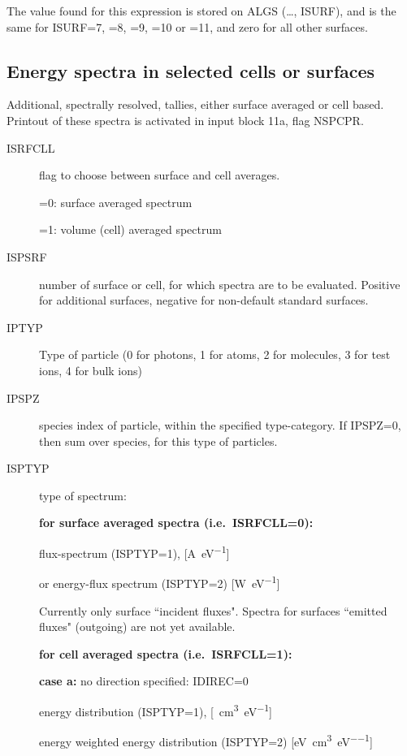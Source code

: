 The value found for this expression is stored on ALGS (\dots, ISURF), and is
the same for ISURF=7, =8, =9, =10 or =11, and zero for all other surfaces.

\subsection{Energy spectra in selected cells or surfaces}\label{sec2.10G}

Additional, spectrally resolved, tallies, either surface averaged or cell
based.
Printout of these spectra is activated in input block 11a, flag NSPCPR.

\begin{description}
  \item[ISRFCLL] flag to choose between surface and cell averages.

        =0:  surface averaged spectrum

        =1:  volume (cell) averaged spectrum
  \item[ISPSRF]
        number of surface or cell, for which spectra are to be evaluated.
        Positive for additional surfaces, negative for non-default standard surfaces.
  \item[IPTYP] Type of particle (0 for photons, 1 for atoms, 2 for molecules, 3
        for test ions, 4 for bulk ions)
  \item[IPSPZ] species index of particle, within
        the specified type-category.
        If IPSPZ=0, then sum over species, for this type of particles.

  \item[ISPTYP] type of spectrum:

        \textbf{for surface averaged spectra (i.e.\ ISRFCLL=0):}

        flux-spectrum (ISPTYP=1), [\si{\ampere\per\electronvolt}]

        or energy-flux spectrum (ISPTYP=2) [\si{\watt\per\electronvolt}]

        Currently only surface ``incident fluxes".
        Spectra for surfaces ``emitted fluxes" (outgoing) are not yet available.

        \textbf{for cell averaged spectra (i.e.\ ISRFCLL=1):}

        \textbf{case a:} no direction specified: IDIREC=0

        energy distribution (ISPTYP=1), [\si{\per\cubic\centi\metre\per\electronvolt}]

        energy weighted energy distribution (ISPTYP=2)
        [\si{\electronvolt\per\cubic\centi\metre\per\electronvolt}]


\end{description}
